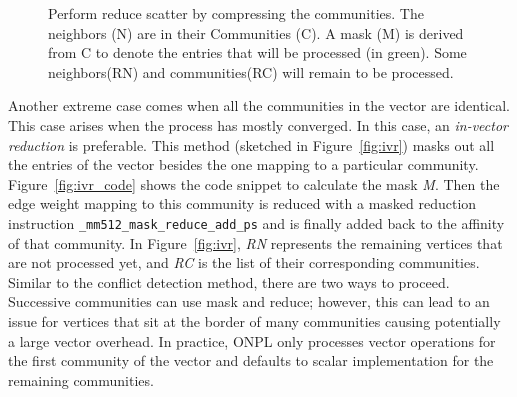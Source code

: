 \documentclass[default,iicol]{sn-jnl}%
\theoremstyle{thmstyleone}%
\theoremstyle{thmstyletwo}%
\theoremstyle{thmstylethree}%
\begin{document}
\begin{figure}[t]
  \centering
  \hspace{.05\linewidth}
  \caption{
  Perform reduce scatter by compressing the communities. The neighbors (N) are  in their Communities (C). A mask (M) is derived from C 
  to denote the entries that will be processed (in green). Some neighbors(RN) and communities(RC) will remain to be processed.
    }
  \label{fig:onpl_vector_lane_compressed}
\end{figure}
Another extreme case comes when all the communities in the vector are identical. This case arises when the process has mostly converged. 
In this case, an \textit{in-vector reduction} is preferable. This method (sketched in Figure~\ref{fig:ivr}) masks out all the entries of the vector 
besides the one mapping to a particular community. Figure~\ref{fig:ivr_code} shows the code snippet to calculate the mask \textit{M}.
Then the edge weight mapping to this community is reduced with a masked reduction 
instruction \texttt{\_mm512\_mask\_reduce\_add\_ps} and is finally added back to the affinity of that community. 
In Figure~\ref{fig:ivr}, \textit{RN} represents the remaining vertices that are not processed yet, 
and \textit{RC} is the list of their corresponding communities. 
Similar to the conflict detection method, there are two ways to proceed. Successive communities can use mask 
and reduce; however, this can lead to an issue for vertices that sit at the border of many communities causing potentially a 
large vector overhead. In practice, ONPL only processes vector operations for the first community of the vector and defaults to 
scalar implementation for the remaining communities.
\end{document}
